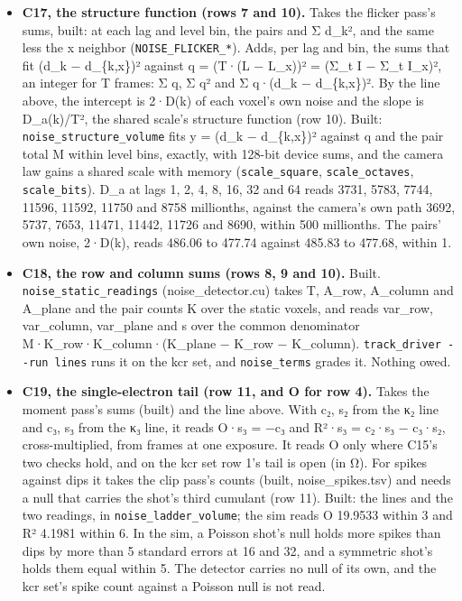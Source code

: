 \begin{enumerate}
\begin{itemize}
\item \textbf{C17, the structure function (rows 7 and 10).} Takes the flicker pass's sums, built: at each lag and level bin, the pairs and Σ d\_\allowbreak{}k², and the same less the x neighbor (\texttt{NOISE\_\allowbreak{}FLICKER\_\allowbreak{}*}). Adds, per lag and bin, the sums that fit (d\_\allowbreak{}k − d\_\allowbreak{}\{k,x\})² against q = (T·(L − L\_\allowbreak{}x))² = (Σ\_\allowbreak{}t I − Σ\_\allowbreak{}t I\_\allowbreak{}x)², an integer for T frames: Σ q, Σ q² and Σ q·(d\_\allowbreak{}k − d\_\allowbreak{}\{k,x\})². By the line above, the intercept is 2·D(k) of each voxel's own noise and the slope is D\_\allowbreak{}a(k)/T², the shared scale's structure function (row 10). Built: \texttt{noise\_\allowbreak{}structure\_\allowbreak{}volume} fits y = (d\_\allowbreak{}k − d\_\allowbreak{}\{k,x\})² against q and the pair total M within level bins, exactly, with 128-bit device sums, and the camera law gains a shared scale with memory (\texttt{scale\_\allowbreak{}square}, \texttt{scale\_\allowbreak{}octaves}, \texttt{scale\_\allowbreak{}bits}). D\_\allowbreak{}a at lags 1, 2, 4, 8, 16, 32 and 64 reads 3731, 5783, 7744, 11596, 11592, 11750 and 8758 millionths, against the camera's own path 3692, 5737, 7653, 11471, 11442, 11726 and 8690, within 500 millionths. The pairs' own noise, 2·D(k), reads 486.06 to 477.74 against 485.83 to 477.68, within 1.
\item \textbf{C18, the row and column sums (rows 8, 9 and 10).} Built. \texttt{noise\_\allowbreak{}static\_\allowbreak{}readings} (noise\_\allowbreak{}detector.cu) takes T, A\_\allowbreak{}row, A\_\allowbreak{}column and A\_\allowbreak{}plane and the pair counts K over the static voxels, and reads var\_\allowbreak{}row, var\_\allowbreak{}column, var\_\allowbreak{}plane and s over the common denominator M·K\_\allowbreak{}row·K\_\allowbreak{}column·(K\_\allowbreak{}plane − K\_\allowbreak{}row − K\_\allowbreak{}column). \texttt{track\_\allowbreak{}driver -\allowbreak{}-\allowbreak{}run lines} runs it on the kcr set, and \texttt{noise\_\allowbreak{}terms} grades it. Nothing owed.
\item \textbf{C19, the single-electron tail (row 11, and O for row 4).} Takes the moment pass's sums (built) and the line above. With c₂, s₂ from the κ₂ line and c₃, s₃ from the κ₃ line, it reads O·s₃ = −c₃ and R²·s₃ = c₂·s₃ − c₃·s₂, cross-multiplied, from frames at one exposure. It reads O only where C15's two checks hold, and on the kcr set row 1's tail is open (in Ω). For spikes against dips it takes the clip pass's counts (built, noise\_\allowbreak{}spikes.tsv) and needs a null that carries the shot's third cumulant (row 11). Built: the lines and the two readings, in \texttt{noise\_\allowbreak{}ladder\_\allowbreak{}volume}; the sim reads O 19.9533 within 3 and R² 4.1981 within 6. In the sim, a Poisson shot's null holds more spikes than dips by more than 5 standard errors at 16 and 32, and a symmetric shot's holds them equal within 5. The detector carries no null of its own, and the kcr set's spike count against a Poisson null is not read.

\end{itemize}
\end{enumerate}
